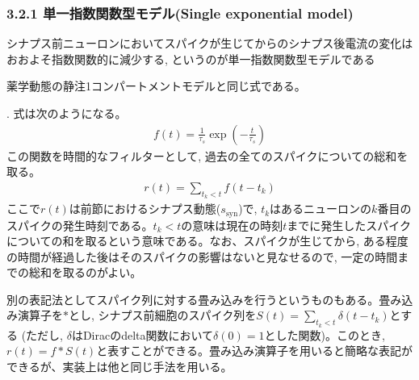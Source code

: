 \documentclass[letterpaper,10pt,english]{sphinxmanual}
\begin{document}
\subsubsection{3.2.1 単一指数関数型モデル(Single exponential model)}
\label{\detokenize{3-3_expo-synapse:single-exponential-model}}
シナプス前ニューロンにおいてスパイクが生じてからのシナプス後電流の変化はおおよそ指数関数的に減少する, というのが単一指数関数型モデルである %
\begin{footnote}[2]\sphinxAtStartFootnote
薬学動態の静注1コンパートメントモデルと同じ式である。
%
\end{footnote}. 式は次のようになる。
\begin{equation*}
\begin{split}
\begin{equation}
f(t)=\frac{1}{\tau_{s}}\exp\left(-\frac{t}{\tau_s}\right)    
\end{equation}
\end{split}
\end{equation*}
この関数を時間的なフィルターとして, 過去の全てのスパイクについての総和を取る。
\begin{equation*}
\begin{split}
\begin{equation}
r(t)=\sum_{t_{k}< t} f\left(t-t_{k}\right)
\end{equation}
\end{split}
\end{equation*}
ここで\({r(t)}\)は前節におけるシナプス動態(\(s_{\text{syn}}\))で, \(t_{k}\)はあるニューロンの\(k\)番目のスパイクの発生時刻である。\({t_{k}<t}\)の意味は現在の時刻\(t\)までに発生したスパイクについての和を取るという意味である。なお、スパイクが生じてから, ある程度の時間が経過した後はそのスパイクの影響はないと見なせるので, 一定の時間までの総和を取るのがよい。

別の表記法としてスパイク列に対する畳み込みを行うというものもある。畳み込み演算子を\(*\)とし, シナプス前細胞のスパイク列を\(S(t)=\sum_{t_{k}< t} \delta\left(t-t_{k}\right)\)とする (ただし, \(\delta\)はDiracのdelta関数において\(\delta(0)=1\)とした関数)。このとき, \(r(t)=f*S(t)\)と表すことができる。畳み込み演算子を用いると簡略な表記ができるが、実装上は他と同じ手法を用いる。
\end{document}
